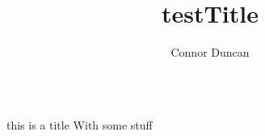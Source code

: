 \documentclass{beamer}
\title{testTitle}
\author{Connor Duncan}
\institute[NREL]{National Renewable Energy Laboratory}
\begin{document}
\begin{frame}[t]
    \begin{columns}[t]
        \separatorcolumn
        \begin{column}{\colwidth}
        \begin{block}{this is a title}
            With some stuff
        \end{block}
        \end{column}
        \separatorcolumn
        \begin{column}{\colwidth}
        \end{column}

        \begin{column}{\colwidth}
            
        \end{column}
    \end{columns}
\end{frame}
\end{document}

